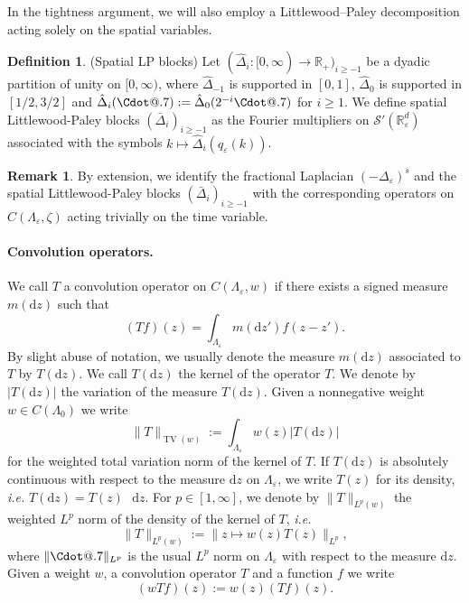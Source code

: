 \documentclass{article}
\makeatletter
\numberwithin{equation}{section}
\newcommand{\assign}{:=}
\newcommand{\mathd}{\mathrm{d}}
\newcommand*\Cdot{{\mathpalette\Cdot@{.7}}}
\newcommand*\Cdot@[2]{\mathbin{\vcenter{\hbox{\scalebox{#2}{\hspace{0.1mm}$\m@th#1\bullet$\hspace{0.1mm}}}}}}
\theoremstyle{plain}
\theoremstyle{definition}
\newtheorem{definition}[theorem]{Definition}
\newtheorem{remark}[theorem]{Remark}
\makeatother
\begin{document}
In the tightness argument, we will also employ a Littlewood--Paley
decomposition acting solely on the spatial variables.

\begin{definition}
  \label{def:space-LP}(Spatial LP blocks) Let $(\hat{\Delta}_i :
  [0, \infty) \rightarrow \mathbb{R}_+)_{i \geqslant - 1}$ be
  a dyadic partition of unity on $[0, \infty)$, where
  $\hat{\Delta}_{- 1}$ is supported in $[0, 1]$, 
  $\hat{\Delta}_0$ is supported in $[1 / 2, 3 / 2]$ and
  $\hat{\Delta}_i (\Cdot) \assign \hat{\Delta}_0 (2^{- i} \Cdot)$ for $i
  \geqslant 1$. We define spatial Littlewood-Paley blocks $(\bar{\Delta}_i)_{i
  \geqslant - 1}$ as the Fourier multipliers on $\mathcal{S}'
  (\mathbb{R}_{\varepsilon}^d)$ associated with the symbols $k \mapsto
  \hat{\Delta}_i (q_{\varepsilon} (k))$.
\end{definition}

\begin{remark}
  By extension, we identify the fractional Laplacian $(-
  \Delta_{\varepsilon})^s$ and the spatial Littlewood-Paley blocks
  $(\bar{\Delta}_i)_{i \geqslant - 1}$ with the corresponding operators on $C
  (\Lambda_{\varepsilon}, \zeta)$ acting trivially on the time variable.
\end{remark}

\paragraph*{Convolution operators.} We call $T$ a convolution
operator on $C (\Lambda_{\varepsilon}, w)$ if there exists a signed measure $m
(\mathd z)$ such that
\[ (T f) (z) = \int_{\Lambda_{\varepsilon}} m (\mathd z') f (z - z') . \]
By slight abuse of notation, we usually denote the measure $m (\mathd z)$
associated to $T$ by $T (\mathd z)$. We call $T (\mathd z)$ the kernel of the
operator $T$. We denote by $| T (\mathd z) |$ the variation of the measure $T
(\mathd z)$. Given a nonnegative weight $w \in C (\Lambda_0)$ we write
\[ \| T \|_{\operatorname{TV} (w)} \assign \int_{\Lambda_{\varepsilon}} w (z)  | T
   (\mathd z) | \]
for the weighted total variation norm of the kernel of $T$. If $T (\mathd z)$
is absolutely continuous with respect to the measure $\mathd z$ on
$\Lambda_{\varepsilon}$, we write $T (z)$ for its density, \textit{i.e.} $T
(\mathd z) = T (z) \text{ } \mathd z$. For $p \in [1, \infty] $, we denote by
$\| T \|_{L^p (w)}$ the weighted $L^p$ norm of the density of the kernel of
$T$, \textit{i.e.}
\[ \| T \|_{L^p (w)} \assign \| z \mapsto w (z) T (z) \|_{L^p}, \]
where $\| \Cdot \|_{L^p}$ is the usual $L^p$ norm on $\Lambda_{\varepsilon}$
with respect to the measure $\mathd z$. Given a weight $w$, a convolution
operator $T$ and a function $f$ we write
\begin{equation}
  (w T f) (z) \assign w (z)  (T f) (z) . \label{eq:notation-w-T}
\end{equation}
\end{document}
